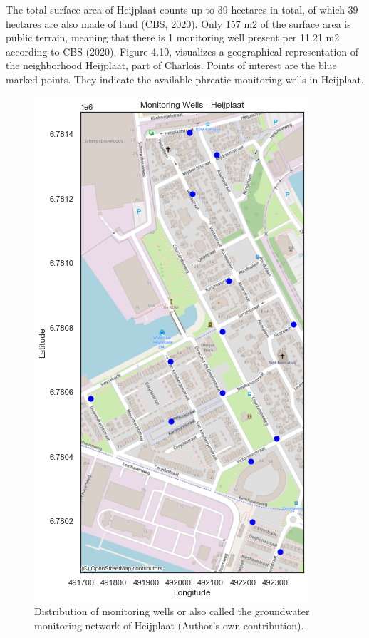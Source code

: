 The total surface area of Heijplaat counts up to 39 hectares in total, of which 39 hectares are also made of land (CBS, 2020). Only 157 m2 of the surface area is public terrain, meaning that there is 1 monitoring well present per 11.21 m2 according to CBS (2020). Figure 4.10, visualizes a geographical representation of the neighborhood Heijplaat, part of Charlois. Points of interest are the blue marked points. They indicate the available phreatic monitoring wells in Heijplaat. 
\begin{figure}[htbp]
    \centering
    \includegraphics[width=0.40\linewidth]{figures/heij/basicheij.png}
    \caption{Distribution of monitoring wells or also called the groundwater monitoring network of Heijplaat (Author's own contribution).}
\end{figure}





